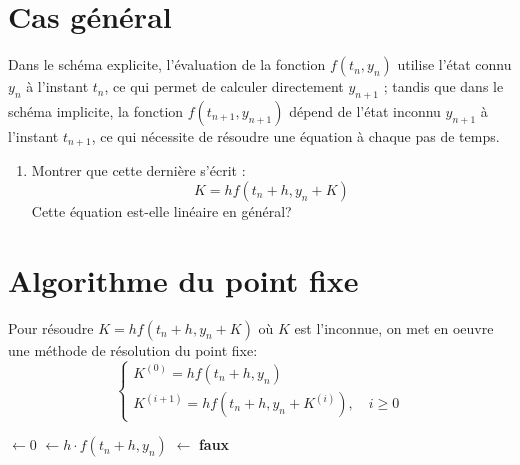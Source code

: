 \documentclass[a4paper, 12pt]{article}
\begin{document}
\section{Cas général}

    Dans le schéma explicite, l'évaluation de la fonction $f(t_n, y_n)$ utilise l'état connu $y_n$ à l'instant $t_n$, ce qui permet de calculer directement $y_{n+1}$ ; tandis que dans le schéma implicite, la fonction $f(t_{n+1}, y_{n+1})$ dépend de l'état inconnu $y_{n+1}$ à l'instant $t_{n+1}$, ce qui nécessite de résoudre une équation à chaque pas de temps.
  
\begin{enumerate}[resume]
   \item Montrer que cette dernière s'écrit : 
   \[
K = h f(t_{n}+h, y_{n}+K)
\]
    Cette équation est-elle linéaire en général? 
                
\end{enumerate}

\section{Algorithme du point fixe}

Pour résoudre  $K = h f(t_n + h, y_n + K)$ où $K$ est l'inconnue, on met en oeuvre une méthode de résolution du point fixe:
\[
\begin{cases}
K^{(0)} = h f(t_n + h, y_n) \\
K^{(i+1)} = h f(t_n + h, y_n + K^{(i)}), \quad i \ge 0
\end{cases}
\]

\begin{algorithm}[H]



\BlankLine
\KwIter $\leftarrow 0$\;
\KwK $\leftarrow h \cdot f(t_n + h, y_n)$ 
\KwConv $\leftarrow$ \textbf{faux}\;



\Return{\KwK}\;
\caption{Méthode du point fixe pour $K = h f(t_n + h, y_n + K)$}
\end{algorithm}
\end{document}
